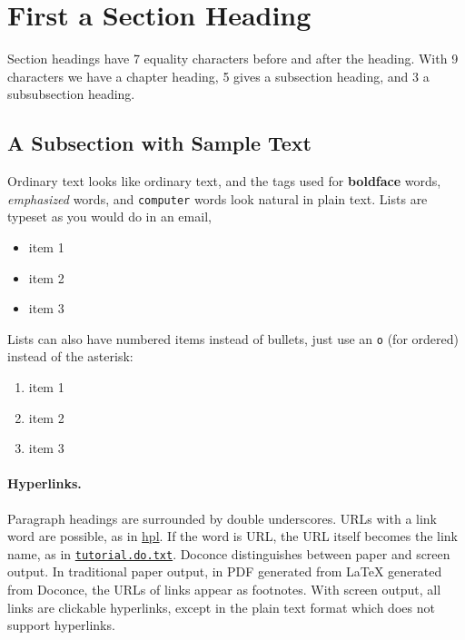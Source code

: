 \documentclass[%
oneside,                 %
final,                   %
10pt]{article}
\begin{document}
\section{First a Section Heading}

Section headings have 7 equality characters before and after the heading.
With 9 characters we have a chapter heading, 5 gives a subsection
heading, and 3 a subsubsection heading.

\subsection{A Subsection with Sample Text}
\label{my:first:sec}

Ordinary text looks like ordinary text, and the tags used for
\textbf{boldface} words, \emph{emphasized} words, and {\fontsize{10pt}{10pt}\Verb!computer!} words look
natural in plain text.  Lists are typeset as you would do in an email,

\begin{itemize}
  \item item 1

  \item item 2

  \item item 3
\end{itemize}

\noindent
Lists can also have numbered items instead of bullets, just use an {\fontsize{10pt}{10pt}\Verb!o!}
(for ordered) instead of the asterisk:

\begin{enumerate}
 \item item 1

 \item item 2

 \item item 3
\end{enumerate}

\noindent
\paragraph{Hyperlinks.}
Paragraph headings are surrounded by double underscores.
URLs with a link word are possible, as in \href{{http://folk.uio.no/hpl}}{hpl}.
If the word is URL, the URL itself becomes the link name,
as in \href{{tutorial.do.txt}}{\nolinkurl{tutorial.do.txt}}. Doconce distinguishes between paper
and screen output. In traditional paper output, in PDF generated from {\LaTeX}
generated from Doconce, the URLs of links appear as footnotes.
With screen output, all links are clickable hyperlinks, except in
the plain text format which does not support hyperlinks.
\end{document}
